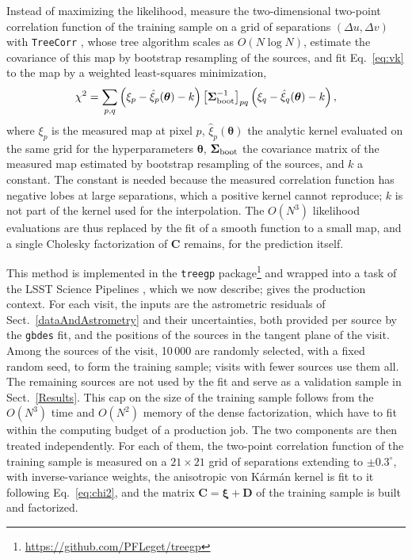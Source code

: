 Instead of maximizing the likelihood,  measure the two-dimensional two-point correlation function of the training 
sample on a grid of separations $(\Delta u, \Delta v)$ with \texttt{TreeCorr} \citep{2004MNRAS.352..338J, 2015ascl.soft08007J}, whose tree algorithm 
scales as $O(N \log N)$, estimate the covariance of this map by bootstrap resampling of the sources, and fit Eq.~\ref{eq:vk} to the map by a weighted 
least-squares minimization,
\begin{equation}
\label{eq:chi2}
\chi^2 = \sum_{p,q} \left(\xi_p - \hat{\xi}_p(\boldsymbol{\theta}) - k\right) \left[\boldsymbol{\Sigma}_{\rm boot}^{-1}\right]_{pq} \left(\xi_q - \hat{\xi}_q(\boldsymbol{\theta}) - k\right),
\end{equation}
where $\xi_p$ is the measured map at pixel $p$, $\hat{\xi}_p(\boldsymbol{\theta})$ the analytic kernel evaluated on the same grid for the 
hyperparameters $\boldsymbol{\theta}$, $\boldsymbol{\Sigma}_{\rm boot}$ the covariance matrix of the measured map estimated by bootstrap resampling of the sources, and $k$ a constant.
The constant is needed because the measured correlation function has negative lobes at large separations, which a positive kernel cannot reproduce; 
$k$ is not part of the kernel used for the interpolation.
The $O(N^3)$ likelihood evaluations are thus replaced by the fit of a smooth function to a small map, and a single Cholesky factorization 
of $\mathbf{C}$ remains, for the prediction itself.

This method is implemented in the \texttt{treegp} package\footnote{\url{https://github.com/PFLeget/treegp}} and wrapped into a task of the 
LSST Science Pipelines \citep{PSTN-019}, which we now describe; \citet{RTN-115} gives the production context.
For each visit, the inputs are the astrometric residuals of Sect.~\ref{dataAndAstrometry} and their uncertainties, both provided per 
source by the \texttt{gbdes} fit, and the positions of the sources in the tangent plane of the visit.
Among the sources of the visit, 10\,000 are randomly selected, with a fixed random seed, to form the training sample; visits with fewer sources use them all.
The remaining sources are not used by the fit and serve as a validation sample in Sect.~\ref{Results}.
This cap on the size of the training sample follows from the $O(N^3)$ time and $O(N^2)$ memory of the dense factorization, which have to 
fit within the computing budget of a production job.
The two components are then treated independently.
For each of them, the two-point correlation function of the training sample is measured on a $21 \times 21$ grid of separations 
extending to $\pm 0.3^\circ$, with inverse-variance weights, the anisotropic von K\'arm\'an kernel is fit to it following Eq.~\ref{eq:chi2}, and 
the matrix $\mathbf{C} = \boldsymbol{\xi} + \mathbf{D}$ of the training sample is built and factorized.

